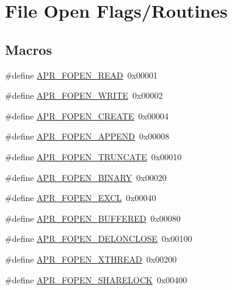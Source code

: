 \hypertarget{group__apr__file__open__flags}{}\section{File Open Flags/\+Routines}
\label{group__apr__file__open__flags}
\subsection*{Macros}
\begin{DoxyCompactItemize}
\item 
\#define \hyperlink{group__apr__file__open__flags_gaf9e7303f028b130ff7d4b209d6662d7d}{A\+P\+R\+\_\+\+F\+O\+P\+E\+N\+\_\+\+R\+E\+AD}~0x00001
\item 
\#define \hyperlink{group__apr__file__open__flags_gac598bb95fc9476b0bf2ed0b1c308842c}{A\+P\+R\+\_\+\+F\+O\+P\+E\+N\+\_\+\+W\+R\+I\+TE}~0x00002
\item 
\#define \hyperlink{group__apr__file__open__flags_gafe94f21ccbf411172e70e7f473af251a}{A\+P\+R\+\_\+\+F\+O\+P\+E\+N\+\_\+\+C\+R\+E\+A\+TE}~0x00004
\item 
\#define \hyperlink{group__apr__file__open__flags_ga45f353db9b71d4760a3f35cf3781cfc8}{A\+P\+R\+\_\+\+F\+O\+P\+E\+N\+\_\+\+A\+P\+P\+E\+ND}~0x00008
\item 
\#define \hyperlink{group__apr__file__open__flags_ga09b05a5bd5db534b93794f7657bcb146}{A\+P\+R\+\_\+\+F\+O\+P\+E\+N\+\_\+\+T\+R\+U\+N\+C\+A\+TE}~0x00010
\item 
\#define \hyperlink{group__apr__file__open__flags_gacb20b3028864f34cb26314fe2cacc3fa}{A\+P\+R\+\_\+\+F\+O\+P\+E\+N\+\_\+\+B\+I\+N\+A\+RY}~0x00020
\item 
\#define \hyperlink{group__apr__file__open__flags_gabb7fb062cdf1d58faee8c7ea518496f1}{A\+P\+R\+\_\+\+F\+O\+P\+E\+N\+\_\+\+E\+X\+CL}~0x00040
\item 
\#define \hyperlink{group__apr__file__open__flags_gac48fd4c853c9f561632a2e8aaf5d8d97}{A\+P\+R\+\_\+\+F\+O\+P\+E\+N\+\_\+\+B\+U\+F\+F\+E\+R\+ED}~0x00080
\item 
\#define \hyperlink{group__apr__file__open__flags_ga5d3756f6d242c667ed1d3f54af4916eb}{A\+P\+R\+\_\+\+F\+O\+P\+E\+N\+\_\+\+D\+E\+L\+O\+N\+C\+L\+O\+SE}~0x00100
\item 
\#define \hyperlink{group__apr__file__open__flags_ga435cd9b2604b11796779c23ffa00a3dd}{A\+P\+R\+\_\+\+F\+O\+P\+E\+N\+\_\+\+X\+T\+H\+R\+E\+AD}~0x00200
\item 
\#define \hyperlink{group__apr__file__open__flags_ga426f6e2a8457ab410d99248269059a18}{A\+P\+R\+\_\+\+F\+O\+P\+E\+N\+\_\+\+S\+H\+A\+R\+E\+L\+O\+CK}~0x00400

\end{DoxyCompactItemize}
